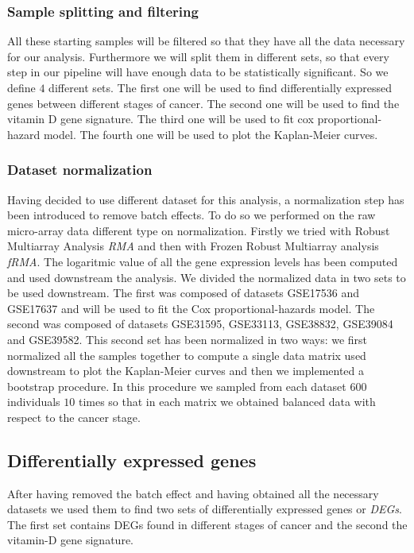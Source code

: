 \documentclass[fleqn,10pt]{SelfArx} %
\begin{document}
		\subsubsection{Sample splitting and filtering}
			All these starting samples will be filtered so that they have all the data necessary for our analysis.
			Furthermore we will split them in different sets, so that every step in our pipeline will have enough data to be statistically significant.
			So we define $4$ different sets.
			The first one will be used to find differentially expressed genes between different stages of cancer.
			The second one will be used to find the vitamin D gene signature.
			The third one will be used to fit cox proportional-hazard model.
			The fourth one will be used to plot the Kaplan-Meier curves.

		\subsubsection{Dataset normalization}
			Having decided to use different dataset for this analysis, a normalization step has been introduced to remove batch effects.
			To do so we performed on the raw micro-array data different type on normalization.
			Firstly we tried with Robust Multiarray Analysis \emph{RMA} and then with Frozen Robust Multiarray analysis \emph{fRMA}.
			The logaritmic value of all the gene expression levels has been computed and used downstream the analysis.
			We divided the normalized data in two sets to be used downstream.
			The first was composed of datasets  GSE17536 and GSE17637 and will be used to fit the Cox proportional-hazards model.
			The second was composed of datasets GSE31595, GSE33113, GSE38832, GSE39084 and GSE39582.
			This second set has been normalized in two ways: we first normalized all the samples together to compute a single data matrix used downstream to plot the Kaplan-Meier curves and then we implemented a bootstrap procedure.
			In this procedure we sampled from each dataset $600$ individuals $10$ times so that in each matrix we obtained balanced data with respect to the cancer stage.

	\subsection{Differentially expressed genes}
		After having removed the batch effect and having obtained all the necessary datasets we used them to find two sets of differentially expressed genes or \emph{DEGs}.
		The first set contains DEGs found in different stages of cancer and the second the vitamin-D gene signature.
\end{document}
